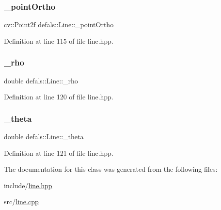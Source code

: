 \mbox{\label{classdefals_1_1_line_a198ea774dbce7e8d8b1d404b22504074}} 
\subsubsection{\texorpdfstring{\+\_\+point\+Ortho}{\_pointOrtho}}
{\footnotesize\ttfamily cv\+::\+Point2f defals\+::\+Line\+::\+\_\+point\+Ortho\hspace{0.3cm}{\ttfamily [private]}}



Definition at line 115 of file line.\+hpp.

\mbox{\label{classdefals_1_1_line_a916e7716467f69bb5cb3c9c6c1d729a3}} 
\subsubsection{\texorpdfstring{\+\_\+rho}{\_rho}}
{\footnotesize\ttfamily double defals\+::\+Line\+::\+\_\+rho\hspace{0.3cm}{\ttfamily [private]}}



Definition at line 120 of file line.\+hpp.

\mbox{\label{classdefals_1_1_line_ad9528d349ad7537ed883a23966cb8830}} 
\subsubsection{\texorpdfstring{\+\_\+theta}{\_theta}}
{\footnotesize\ttfamily double defals\+::\+Line\+::\+\_\+theta\hspace{0.3cm}{\ttfamily [private]}}



Definition at line 121 of file line.\+hpp.



The documentation for this class was generated from the following files\+:\begin{DoxyCompactItemize}
\item 
include/\hyperlink{line_8hpp}{line.\+hpp}\item 
src/\hyperlink{line_8cpp}{line.\+cpp}\end{DoxyCompactItemize}
